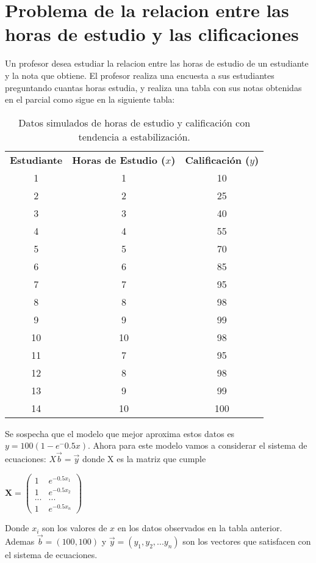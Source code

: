 \documentclass{article}
\begin{document}
\section{Problema de la relacion entre las horas de estudio y las clificaciones}

Un profesor desea estudiar la relacion entre las horas de estudio de un estudiante y la nota que obtiene. El profesor
realiza una encuesta a sus estudiantes preguntando cuantas horas estudia, y realiza una tabla con sus notas obtenidas 
en el parcial como sigue en la siguiente tabla:
\begin{table}[h!]
    \centering
    \begin{tabular}{|c|c|c|}
    \hline
    \textbf{Estudiante} & \textbf{Horas de Estudio (\(x\))} & \textbf{Calificación (\(y\))} \\
    1  & 1  & 10   \\ \hline 
    2  & 2  & 25   \\ \hline
    3  & 3  & 40   \\ \hline
    4  & 4  & 55   \\ \hline
    5  & 5  & 70   \\ \hline
    6  & 6  & 85   \\ \hline
    7  & 7  & 95   \\ \hline
    8  & 8  & 98   \\ \hline
    9  & 9  & 99   \\ \hline
    10 & 10 & 98  \\ \hline
    11  & 7  & 95   \\ \hline
    12  & 8  & 98   \\ \hline
    13  & 9  & 99   \\ \hline
    14 & 10 & 100  \\ \hline
    \end{tabular}
    \caption{Datos simulados de horas de estudio y calificación con tendencia a estabilización.}
    \label{tabla:horas_estudio_aplanada}
\end{table}

Se sospecha que el modelo que mejor aproxima estos datos es $y = 100(1-e^-0.5x)$. Ahora para este modelo vamos a 
considerar el sistema de ecuaciones: $X\vec{b} = \vec{y}$ donde X es la matriz que cumple
\begin{center}
$ \mathbf{X} = \begin{pmatrix} 1 & e^{-0.5x_1} \\ 1 & e^{-0.5x_2} \\ ... & ... \\ 1 & e^{-0.5x_n} \end{pmatrix} $  
\end{center}

Donde \(x_i\) son los valores de \(x\) en los datos observados en la tabla anterior. Ademas $\vec{b} = (100,100)$ y 
$\vec{y} = (y_1,y_2,...y_n)$ son los vectores que satisfacen con el sistema de ecuaciones. 
\end{document}
